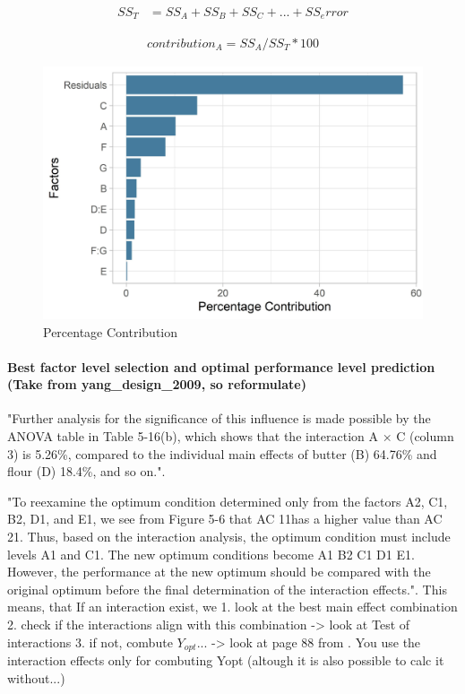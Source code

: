 \begin{equation} \label{SS_T}
	\begin{split}
		SS_T & = SS_A + SS_B + SS_C + ... + SS_error
	\end{split}
\end{equation}

\begin{equation} \label{SS_T}
	\begin{split}
		contribution_A = SS_A / SS_T * 100
	\end{split}
\end{equation}


\begin{figure}[H] 
	\label{figure:taguchi:percentage_contribution}
	\includegraphics[width=1\linewidth]{simulations/taguchi/plots/percentage_contribution}
	\caption{Percentage Contribution}
\end{figure}

\paragraph{Best factor level selection and optimal performance level prediction (Take from yang\_design\_2009, so reformulate)}

"Further analysis for the significance of this influence is made possible by the ANOVA table in Table 5-16(b), which shows that the interaction A × C (column 3) is 5.26\%, compared to the individual main effects of butter (B) 64.76\% and flour (D) 18.4\%, and so on."\cite{roy_primer_1990}.

"To reexamine the optimum condition determined only from the factors A2, C1, B2, D1, and E1, we see from Figure 5-6 that AC 11has a higher value than AC 21. Thus, based on the interaction analysis, the optimum condition must include levels A1 and C1. The new optimum conditions become A1 B2 C1 D1 E1. However, the performance at the new optimum should be compared with the original optimum before the final determination of the interaction effects."\cite{roy_primer_1990}.
This means, that If an interaction exist, we
1. look at the best main effect combination
2. check if the interactions align with this combination -> look at Test of interactions
3. if not, combute $Y_{opt}$... -> look at page 88 from \cite{roy_primer_1990}. You use the interaction effects only for combuting Yopt (altough it is also possible to calc it without...)

